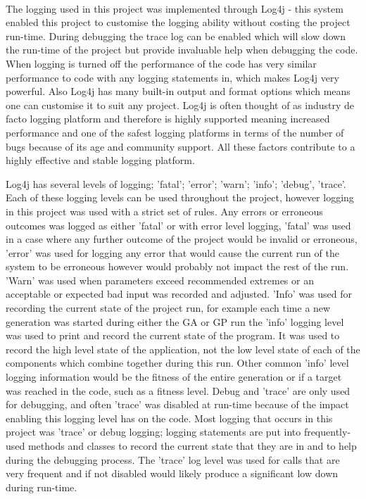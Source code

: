 \documentclass[12pt]{article}
\begin{document}
\paragraph{}

The logging used in this project was implemented through Log4j - this system enabled this project to customise the logging 
ability without costing the project run-time. During debugging the trace log can be enabled which will slow down the
run-time of the project but provide invaluable help when debugging the code. When logging is turned off the performance
of the code has very similar performance to code with any logging statements in, which makes Log4j very powerful. Also
Log4j has many built-in output and format options which means one can customise it to suit any project. Log4j is often
thought of as industry de facto logging platform and therefore is highly supported meaning increased performance
and one of the safest logging platforms in terms of the number of bugs because of its age and community support. All these
factors contribute to a highly effective and stable logging platform. 

Log4j has several levels of logging; 'fatal'; 'error'; 'warn'; 'info'; 'debug', 'trace'. Each of these logging levels can be used throughout
the project, however logging in this project was used with a strict set of rules. Any errors or erroneous outcomes 
was logged as either 'fatal' or with error level logging, 'fatal' was used in a case where any further outcome of the project
would be invalid or erroneous, 'error' was used for logging any error that would cause the current run of the system to be
erroneous however would probably not impact the rest of the run. 'Warn' was used when parameters exceed recommended
extremes or an acceptable or expected bad input was recorded and adjusted. 'Info' was used for recording the current state of
the project run, for example each time a new generation was started during either the GA or GP run the 'info' logging level was
used to print and record the current state of the program. It was used to record the high level state of the application,
not the low level state of each of the components which combine together during this run. Other common 'info' level logging
information would be the fitness of the entire generation or if a target was reached in the code, such as a fitness level.
Debug and 'trace' are only used for debugging, and often 'trace' was disabled at run-time because of the impact enabling this
logging level has on the code. Most logging that occurs in this project was 'trace' or debug logging; logging statements are
put into frequently-used methods and classes to record the current state that they are in and to help during the debugging
process. The 'trace' log level was used for calls that are very frequent and if not disabled would likely produce a significant
low down during run-time. 
\end{document}
